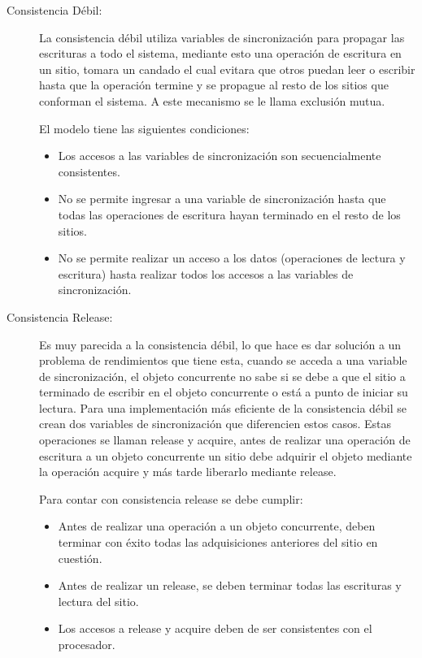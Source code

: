 \begin{description}

\item[Consistencia Débil:]

La consistencia débil utiliza variables de sincronización para propagar las escrituras a todo el sistema, mediante esto una operación de escritura en un sitio, tomara un candado el cual evitara que otros puedan leer o escribir hasta que la operación termine y se propague al resto de los sitios que conforman el sistema. A este mecanismo se le llama exclusión mutua.

El modelo tiene las siguientes condiciones:

\begin{itemize}
\item Los accesos a las variables de sincronización son secuencialmente consistentes.
\item No se permite ingresar a una variable de sincronización hasta que todas las operaciones de escritura hayan terminado en el resto de los sitios.
\item No se permite realizar un acceso a los datos (operaciones de lectura y escritura) hasta realizar todos los accesos a las variables de sincronización. 
\end{itemize}


\item[Consistencia Release:]
Es muy parecida a la consistencia débil, lo que hace es dar solución a un problema de rendimientos que tiene esta, cuando se acceda a una variable de sincronización, el objeto concurrente no sabe si se debe a que el sitio a terminado de escribir en el objeto concurrente o está a punto de iniciar su lectura. Para una implementación más eficiente de la consistencia débil se crean dos variables de sincronización que diferencien estos casos. Estas operaciones se llaman release y acquire, antes de realizar una operación de escritura a un objeto concurrente un sitio debe adquirir el objeto mediante la operación acquire y más tarde liberarlo mediante release.

Para contar con consistencia release se debe cumplir:

\begin{itemize}
\item Antes de realizar una operación  a un objeto concurrente, deben terminar con éxito todas las adquisiciones anteriores del sitio en cuestión.
\item Antes de realizar un release, se deben terminar todas las escrituras y lectura del sitio.
\item Los accesos a release y acquire deben de ser consistentes con el procesador.
\end{itemize}



\end{description}
